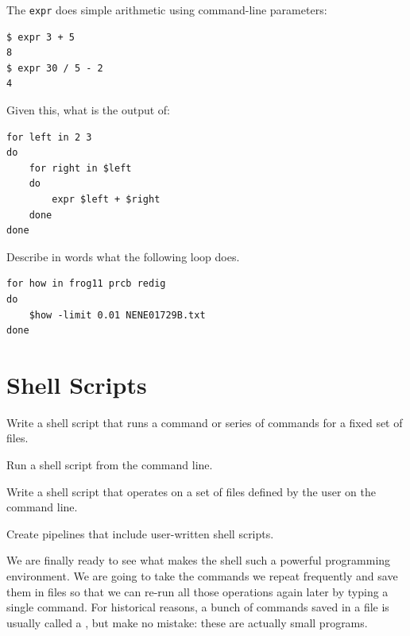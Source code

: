 \documentclass{book}
\begin{document}
\begin{challenge}
  The \texttt{expr} does simple arithmetic using command-line
  parameters:

\begin{verbatim}
$ expr 3 + 5
8
$ expr 30 / 5 - 2
4
\end{verbatim}

  Given this, what is the output of:

\begin{verbatim}
for left in 2 3
do
    for right in $left
    do
        expr $left + $right
    done
done
\end{verbatim}
\end{challenge}

\begin{challenge}
  Describe in words what the following loop does.

\begin{verbatim}
for how in frog11 prcb redig
do
    $how -limit 0.01 NENE01729B.txt
done
\end{verbatim}
\end{challenge}

\section{Shell Scripts}

\begin{objectives}
\begin{swcitemize}
\item
  Write a shell script that runs a command or series of commands for a
  fixed set of files.
\item
  Run a shell script from the command line.
\item
  Write a shell script that operates on a set of files defined by the
  user on the command line.
\item
  Create pipelines that include user-written shell scripts.
\end{swcitemize}
\end{objectives}

We are finally ready to see what makes the shell such a powerful
programming environment. We are going to take the commands we repeat
frequently and save them in files so that we can re-run all those
operations again later by typing a single command. For historical
reasons, a bunch of commands saved in a file is usually called a
, but make no mistake: these are
actually small programs.
\end{document}
